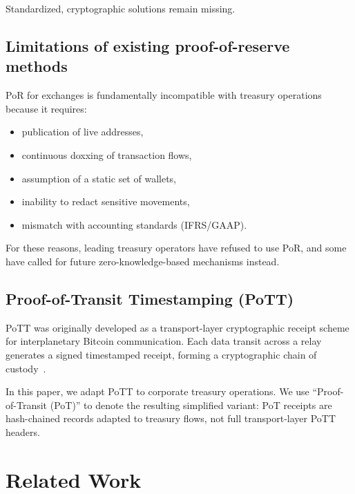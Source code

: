 \documentclass[11pt]{article}
\begin{document}
Standardized, cryptographic solutions remain missing.

\subsection{Limitations of existing proof-of-reserve methods}

PoR for exchanges is fundamentally incompatible with treasury operations because it requires:

\begin{itemize}[noitemsep]
\item publication of live addresses,
\item continuous doxxing of transaction flows,
\item assumption of a static set of wallets,
\item inability to redact sensitive movements,
\item mismatch with accounting standards (IFRS/GAAP).
\end{itemize}

For these reasons, leading treasury operators have refused to use PoR, and some have called for future zero-knowledge-based mechanisms instead.

\subsection{Proof-of-Transit Timestamping (PoTT)}

PoTT was originally developed as a transport-layer cryptographic receipt scheme for interplanetary Bitcoin communication. Each data transit across a relay generates a signed timestamped receipt, forming a cryptographic chain of custody~\cite{Puente2025}.

In this paper, we adapt PoTT to corporate treasury operations.
We use ``Proof-of-Transit (PoT)'' to denote the resulting simplified variant: PoT receipts are
hash-chained records adapted to treasury flows, not full transport-layer PoTT headers.

\section{Related Work}
\label{sec:related}
\end{document}
